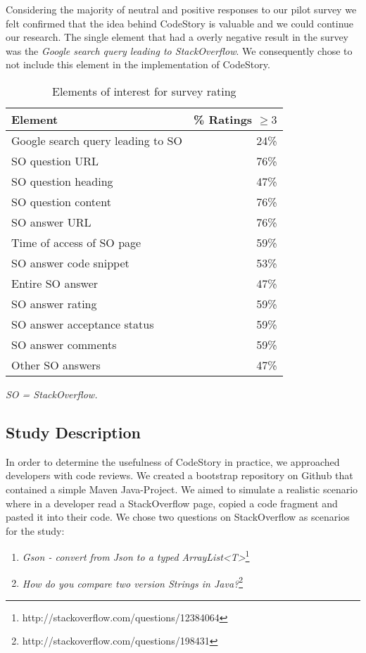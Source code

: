 \documentclass[../manifest.tex]{subfiles}
\begin{document}
Considering the majority of neutral and positive responses to our pilot survey we felt confirmed that the idea behind CodeStory is valuable and we could continue our research. The single element that had a overly negative result in the survey was the \textit{Google search query leading to StackOverflow}. We consequently chose to not include this element in the implementation of CodeStory.

\begin{table}[t]
    \centering
    \begin{threeparttable}
    \begin{tabular*}{\linewidth}{lr}
    \hline
    \textbf{Element} & \textbf{\% Ratings $\ge3$} \\
    \hline
    Google search query leading to SO & 24\% \\
    SO question URL & 76\% \\
    SO question heading & 47\% \\
    SO question content & 76\% \\
    SO answer URL & 76\% \\
    Time of access of SO page & 59\% \\
    SO answer code snippet & 53\% \\
    Entire SO answer & 47\% \\
    SO answer rating & 59\% \\
    SO answer acceptance status & 59\% \\
    SO answer comments & 59\% \\
    Other SO answers & 47\% \\
    \hline
  \end{tabular*}
  \begin{tablenotes}\footnotesize
    \item \textit{SO = StackOverflow.}
  \end{tablenotes}
  \end{threeparttable}
    \caption{Elements of interest for survey rating}
    \label{tab:elements-of-interest}
\end{table}

\subsection{Study Description} \label{eval-description}

In order to determine the usefulness of CodeStory in practice, we approached developers with code reviews. We created a bootstrap repository on Github that contained a simple Maven Java-Project. We aimed to simulate a realistic scenario where in a developer read a StackOverflow page, copied a code fragment and pasted it into their code. We chose two questions on StackOverflow as scenarios for the study:
\begin{enumerate}
  \item \textit{Gson - convert from Json to a typed ArrayList<T>}\footnote{http://stackoverflow.com/questions/12384064}
  \item \textit{How do you compare two version Strings in Java?}\footnote{http://stackoverflow.com/questions/198431}
\end{enumerate}
\end{document}
